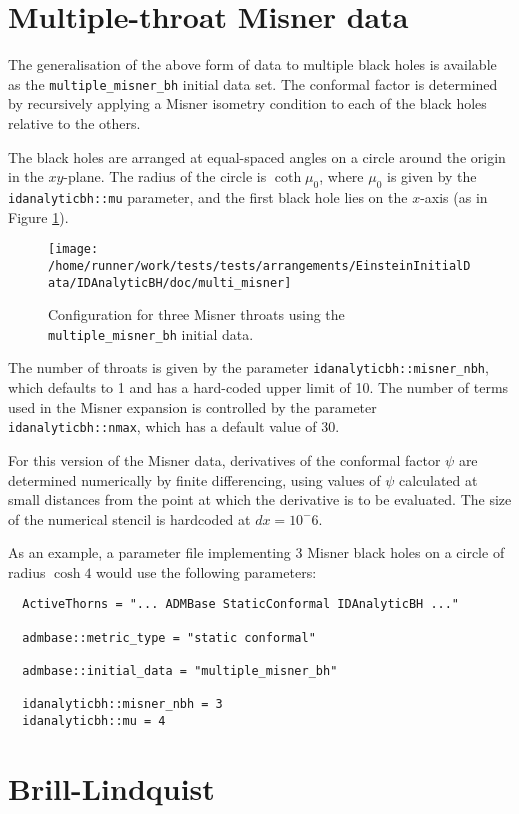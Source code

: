 \documentclass{article}
\begin{document}
\section{Multiple-throat Misner data}

The generalisation of the above form of data to multiple black holes
is available as the \texttt{multiple\_misner\_bh} initial data set. The
conformal factor is determined by recursively applying a Misner
isometry condition to each of the black holes relative to the others.

The black holes are arranged at equal-spaced angles on a circle around
the origin in the $xy$-plane. The radius of the circle is $\coth\mu_0$,
where $\mu_0$ is given by the \texttt{idanalyticbh::mu} parameter, and
the first black hole lies on the $x$-axis (as in Figure
\ref{fig:multi_misner}).
\begin{figure}
  \centering
  \label{fig:multi_misner}
  \texttt{[image: /home/runner/work/tests/tests/arrangements/EinsteinInitialData/IDAnalyticBH/doc/multi\_misner]}
  \caption{Configuration for three Misner throats using the
  \texttt{multiple\_misner\_bh} initial data.}
\end{figure}

The number of throats is given by the parameter
\texttt{idanalyticbh::misner\_nbh}, which defaults to 1 and has a
hard-coded upper limit of 10. The number of terms used in the Misner
expansion is controlled by the parameter
\texttt{idanalyticbh::nmax}, which has a default value of 30.

For this version of the Misner data, derivatives of the conformal
factor $\psi$ are determined numerically by finite differencing,
using values of $\psi$ calculated at small distances from the point at
which the derivative is to be evaluated. The size of the numerical
stencil is hardcoded at $dx=10^-6$.

As an example, a parameter file implementing 3 Misner black holes on a
circle of radius $\cosh 4$ would use the following parameters:
\begin{verbatim}
  ActiveThorns = "... ADMBase StaticConformal IDAnalyticBH ..."

  admbase::metric_type = "static conformal"

  admbase::initial_data = "multiple_misner_bh"

  idanalyticbh::misner_nbh = 3
  idanalyticbh::mu = 4
\end{verbatim}


\section{Brill-Lindquist}
\end{document}
